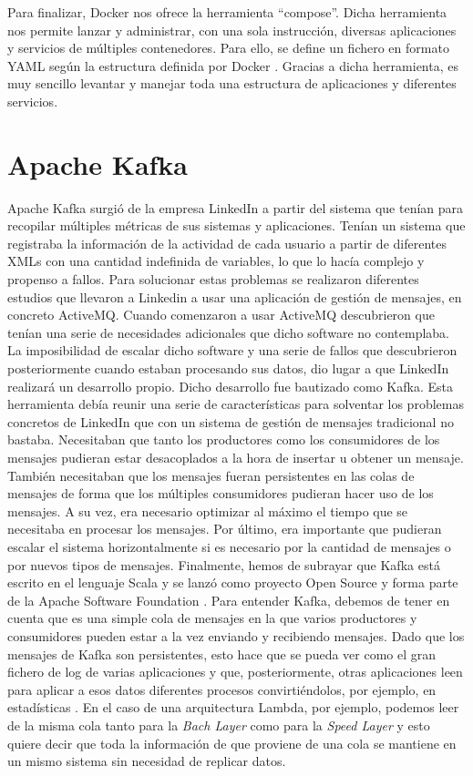 Para finalizar, Docker nos ofrece la herramienta ``compose''. Dicha
herramienta nos permite lanzar y administrar, con una sola instrucción,
diversas aplicaciones y servicios de múltiples contenedores. Para ello, se
define un fichero en formato YAML según la estructura definida por Docker
\cite{Dck-13}. Gracias a dicha herramienta, es muy sencillo levantar y
manejar toda una estructura de aplicaciones y diferentes servicios.



\section{Apache Kafka\label{Kafka}}

Apache Kafka surgió de la empresa LinkedIn a partir del sistema que tenían
para recopilar múltiples métricas de sus sistemas y aplicaciones. Tenían un
sistema que registraba la información de la actividad de cada usuario a
partir de diferentes XMLs con una cantidad indefinida de variables, lo que
lo hacía complejo y propenso a fallos. Para solucionar estas problemas se
realizaron diferentes estudios que llevaron a Linkedin a usar una
aplicación de gestión de mensajes, en concreto ActiveMQ. Cuando comenzaron
a usar ActiveMQ descubrieron que tenían una serie de necesidades
adicionales que dicho software no contemplaba. La imposibilidad de escalar
dicho software y una serie de fallos que descubrieron posteriormente cuando
estaban procesando sus datos, dio lugar a que LinkedIn realizará un
desarrollo propio. Dicho desarrollo fue bautizado como Kafka. Esta
herramienta debía reunir una serie de características para solventar los
problemas concretos de LinkedIn que con un sistema de gestión de mensajes
tradicional no bastaba. Necesitaban que tanto los productores como los
consumidores de los mensajes pudieran estar desacoplados a la hora de
insertar u obtener un mensaje. También necesitaban que los mensajes fueran
persistentes en las colas de mensajes de forma que los múltiples
consumidores pudieran hacer uso de los mensajes. A su vez, era necesario
optimizar al máximo el tiempo que se necesitaba en procesar los mensajes.
Por último, era importante que pudieran escalar el sistema horizontalmente
si es necesario por la cantidad de mensajes o por nuevos tipos de mensajes.
Finalmente, hemos de subrayar que Kafka está escrito en el lenguaje Scala y
se lanzó como proyecto Open Source y forma parte de la Apache Software
Foundation \cite{Kfk-1}. Para entender Kafka, debemos de tener en cuenta
que es una simple cola de mensajes en la que varios productores y
consumidores pueden estar a la vez enviando y recibiendo mensajes. Dado que
los mensajes de Kafka son persistentes, esto hace que se pueda ver como el
gran fichero de log de varias aplicaciones y que, posteriormente, otras
aplicaciones leen para aplicar a esos datos diferentes procesos
convirtiéndolos, por ejemplo, en estadísticas \cite{Kfk-6}. En el caso de
una arquitectura Lambda, por ejemplo, podemos leer de la misma cola tanto
para la \emph{Bach Layer} como para la \emph{Speed Layer} y esto quiere
decir que toda la información de que proviene de una cola se mantiene en un
mismo sistema sin necesidad de replicar datos.

